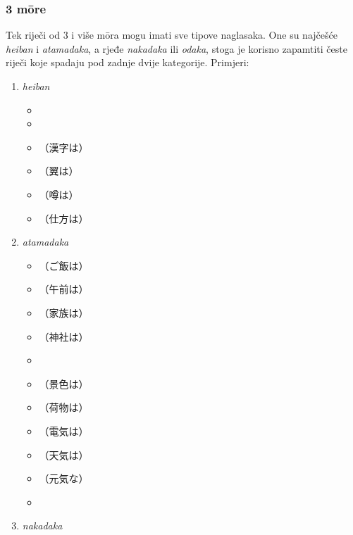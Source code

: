 \subsubsection*{3 m\=ore}
Tek riječi od 3 i više m\=ora mogu imati sve tipove naglasaka.
One su najčešće \textit{heiban} i \textit{atamadaka}, a rjeđe \textit{nakadaka} ili \textit{odaka}, stoga je korisno zapamtiti česte riječi koje spadaju pod zadnje dvije kategorije.
Primjeri:
\begin{enumerate}
	\item \textit{heiban}
	\begin{multicols}{3}
		\begin{itemize}
			\item {}
			\item {}
			\item {}（漢字は）
			\item {}（翼は）
			\item {}（噂は）
			\item {}（仕方は）
		\end{itemize}
	\end{multicols}
	\item \textit{atamadaka}
	\begin{multicols}{3}
		\begin{itemize}
			\item {}（ご飯は）
			\item {}（午前は）
			\item {}（家族は）
			\item {}（神社は）
			\item {}
			\item {}（景色は）
			\item {}（荷物は）
			\item {}（電気は）
			\item {}（天気は）
			\item {}（元気な）
			\item {}
		\end{itemize}
	\end{multicols} %
	\item \textit{nakadaka}

\end{enumerate}
